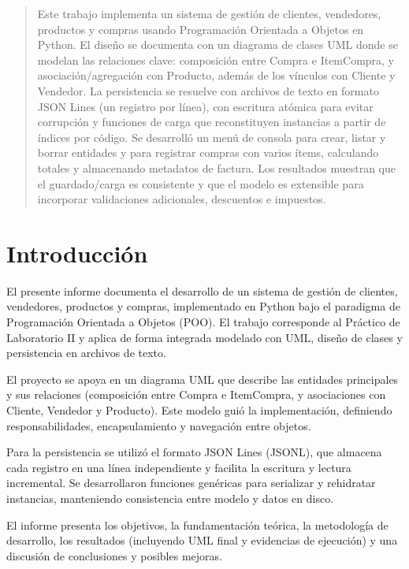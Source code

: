 \documentclass[11pt]{article}
\begin{document}
\begin{abstract}
    Este trabajo implementa un sistema de gestión de clientes, vendedores, productos y compras usando Programación Orientada a Objetos en Python. El diseño se documenta con un diagrama de clases UML donde se modelan las relaciones clave: composición entre Compra e ItemCompra, y asociación/agregación con Producto, además de los vínculos con Cliente y Vendedor. La persistencia se resuelve con archivos de texto en formato JSON Lines (un registro por línea), con escritura atómica para evitar corrupción y funciones de carga que reconstituyen instancias a partir de índices por código. Se desarrolló un menú de consola para crear, listar y borrar entidades y para registrar compras con varios ítems, calculando totales y almacenando metadatos de factura. Los resultados muestran que el guardado/carga es consistente y que el modelo es extensible para incorporar validaciones adicionales, descuentos e impuestos.
\end{abstract}

\newpage
\tableofcontents
\newpage

\section{Introducción}

El presente informe documenta el desarrollo de un sistema de gestión de clientes, vendedores, productos y compras, implementado en Python bajo el paradigma de Programación Orientada a Objetos (POO). El trabajo corresponde al Práctico de Laboratorio II y aplica de forma integrada modelado con UML, diseño de clases y persistencia en archivos de texto.

El proyecto se apoya en un diagrama UML que describe las entidades principales y sus relaciones (composición entre Compra e ItemCompra, y asociaciones con Cliente, Vendedor y Producto). Este modelo guió la implementación, definiendo responsabilidades, encapsulamiento y navegación entre objetos.

Para la persistencia se utilizó el formato JSON Lines (JSONL), que almacena cada registro en una línea independiente y facilita la escritura y lectura incremental. Se desarrollaron funciones genéricas para serializar y rehidratar instancias, manteniendo consistencia entre modelo y datos en disco.

El informe presenta los objetivos, la fundamentación teórica, la metodología de desarrollo, los resultados (incluyendo UML final y evidencias de ejecución) y una discusión de conclusiones y posibles mejoras.
\end{document}
